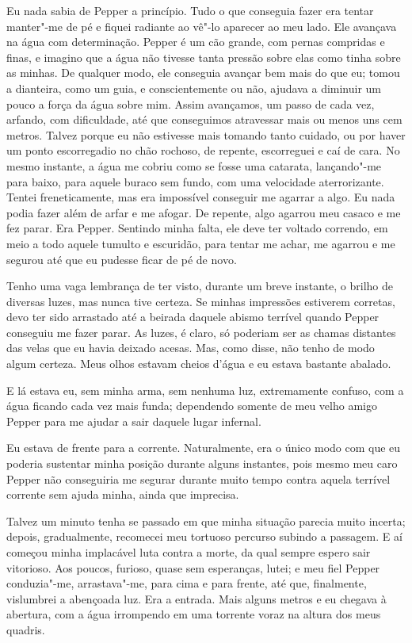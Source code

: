 Eu nada sabia de Pepper a princípio. Tudo o que conseguia fazer era tentar manter"-me de pé e fiquei radiante ao vê"-lo
aparecer ao meu lado. Ele avançava na água com determinação. Pepper é um cão grande, com pernas compridas e finas, e
imagino que a água não tivesse tanta pressão sobre elas como tinha sobre as minhas. De qualquer modo, ele conseguia
avançar bem mais do que eu; tomou a dianteira, como um guia, e conscientemente ou não, ajudava a diminuir um pouco a
força da água sobre mim. Assim avançamos, um passo de cada vez, arfando, com dificuldade, até que conseguimos
atravessar mais ou menos uns cem metros. Talvez porque eu não estivesse mais tomando tanto cuidado, ou por
haver um ponto escorregadio no chão rochoso, de repente, escorreguei e caí de cara. No mesmo instante, a água me cobriu
como se fosse uma catarata, lançando"-me para baixo, para aquele buraco sem fundo, com uma velocidade aterrorizante.
Tentei freneticamente, mas era impossível conseguir me agarrar a algo. Eu nada podia fazer além de arfar e me afogar.
De repente, algo agarrou meu casaco e me fez parar. Era Pepper. Sentindo minha falta, ele deve ter voltado correndo, em
meio a todo aquele tumulto e escuridão, para tentar me achar, me agarrou e me segurou até que eu pudesse ficar
de pé de novo.

Tenho uma vaga lembrança de ter visto, durante um breve instante, o brilho de diversas luzes, mas nunca tive certeza.
Se minhas impressões estiverem corretas, devo ter sido arrastado até a beirada daquele abismo terrível quando Pepper
conseguiu me fazer parar. As luzes, é claro, só poderiam ser as chamas distantes das velas que eu havia deixado
acesas. Mas, como disse, não tenho de modo algum certeza. Meus olhos estavam cheios d’água e eu estava bastante
abalado.

E lá estava eu, sem minha arma, sem nenhuma luz, extremamente confuso, com a água ficando cada vez mais funda;
dependendo somente de meu velho amigo Pepper para me ajudar a sair daquele lugar infernal.

Eu estava de frente para a corrente. Naturalmente, era o único modo com que eu poderia sustentar minha posição durante
alguns instantes, pois mesmo meu caro Pepper não conseguiria me segurar durante muito tempo contra aquela terrível
corrente sem ajuda minha, ainda que imprecisa.

Talvez um minuto tenha se passado em que minha situação parecia muito incerta; depois, gradualmente, recomecei meu
tortuoso percurso subindo a passagem. E aí começou minha implacável luta contra a morte, da qual sempre espero sair
vitorioso. Aos poucos, furioso, quase sem esperanças, lutei; e meu fiel Pepper conduzia"-me, arrastava"-me, para
cima e para frente, até que, finalmente, vislumbrei a abençoada luz. Era a entrada. Mais alguns metros e eu chegava à
abertura, com a água irrompendo em uma torrente voraz na altura dos meus quadris.

